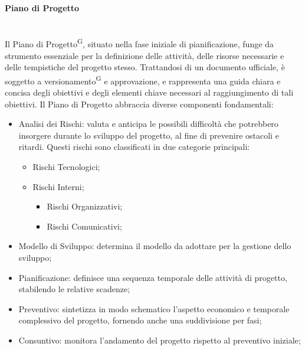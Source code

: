 \documentclass[5pt]{article}
\begin{document}
\paragraph{Piano di Progetto}~\\
Il Piano di Progetto\textsuperscript{G}, situato nella fase iniziale di pianificazione, funge da strumento essenziale per la definizione delle attività, delle risorse necessarie e delle tempistiche del progetto stesso. Trattandosi di un documento ufficiale, è soggetto a versionamento\textsuperscript{G} e approvazione, e rappresenta una guida chiara e concisa degli obiettivi e degli elementi chiave necessari al raggiungimento di tali obiettivi.
Il Piano di Progetto abbraccia diverse componenti fondamentali:
\begin{itemize}
    \item Analisi dei Rischi: valuta e anticipa le possibili difficoltà che potrebbero insorgere durante lo sviluppo del progetto, al fine di prevenire ostacoli e ritardi. Questi rischi sono classificati in due categorie principali:
    \begin{itemize}
        \item Rischi Tecnologici;
        \item Rischi Interni;
        \begin{itemize}
            \item Rischi Organizzativi;
            \item Rischi Comunicativi;
        \end{itemize}
    \end{itemize}
    \item Modello di Sviluppo: determina il modello da adottare per la gestione dello sviluppo;
    \item Pianificazione: definisce una sequenza temporale delle attività di progetto, stabilendo le relative scadenze;
    \item Preventivo: sintetizza in modo schematico l'aspetto economico e temporale complessivo del progetto, fornendo anche una suddivisione per fasi;
    \item Consuntivo: monitora l'andamento del progetto rispetto al preventivo iniziale;
\end{itemize}
\end{document}
